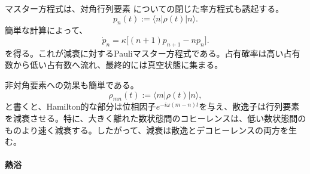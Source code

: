 \documentclass[a4paper,11pt,oneside]{article}
\theoremstyle{definition}
\numberwithin{equation}{section}
\begin{document}
マスター方程式は、対角行列要素
についての閉じた率方程式も誘起する。
\begin{equation}
p_n(t):=\langle n|\rho(t)|n\rangle .
\end{equation}
簡単な計算によって、
\begin{equation}\label{oscPauliDamp}
\dot p_n
=
\kappa\bigl[(n+1)p_{n+1}-np_n\bigr] .
\end{equation}
を得る。これが減衰に対するPauliマスター方程式である。占有確率は高い占有数から低い占有数へ流れ、最終的には真空状態に集まる。



非対角要素への効果も簡単である。
\begin{equation}
\rho_{mn}(t):=\langle m|\rho(t)|n\rangle ,
\end{equation}
と書くと、Hamilton的な部分は位相因子$e^{-i\omega(m-n)t}$を与え、散逸子は行列要素を減衰させる。特に、大きく離れた数状態間のコヒーレンスは、低い数状態間のものより速く減衰する。したがって、減衰は散逸とデコヒーレンスの両方を生む。





\paragraph{熱浴}
\end{document}
